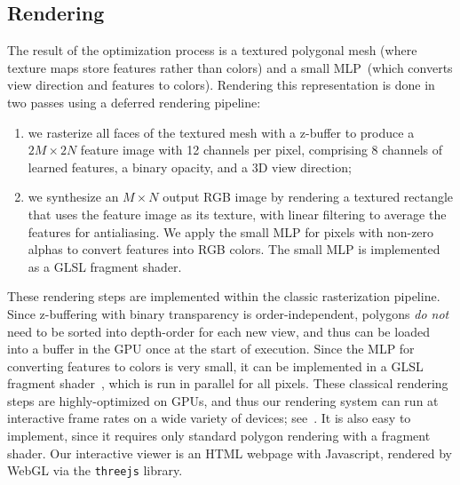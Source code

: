 \subsection{Rendering}
\label{sec:rendering}
The result of the optimization process is a textured polygonal mesh (where texture maps store features rather than colors) and a small MLP~(which converts view direction and features to colors).
Rendering this representation is done in two passes using a deferred rendering pipeline:
\begin{enumerate}
\item we rasterize all faces of the textured mesh with a z-buffer to produce a $2M {\times} 2N$ feature image with 12 channels per pixel, comprising $8$ channels of learned features, a binary opacity, and a 3D view direction;
\item we synthesize an $M \times N$ output RGB image by rendering a textured rectangle that uses the feature image as its texture, with linear filtering to average the features for antialiasing. We apply the small MLP for pixels with non-zero alphas to convert features into RGB colors. The small MLP is implemented as a GLSL fragment shader.
\end{enumerate}
These rendering steps are implemented within the classic rasterization pipeline.  Since z-buffering with binary transparency is order-independent, polygons \textit{do not} need to be sorted into depth-order for each new view, and thus can be loaded into a buffer in the GPU once at the start of execution.
Since the MLP for converting features to colors is very small, it can be implemented in a GLSL fragment shader~\cite{hedman2021snerg}, which is run in parallel for all pixels.
These classical rendering steps are highly-optimized on GPUs, and thus our rendering system can run at interactive frame rates on a wide variety of devices; see~.
It is also easy to implement, since it requires only standard polygon rendering with a fragment shader.
Our interactive viewer is an HTML webpage with Javascript, rendered by WebGL via the \texttt{threejs} library.


